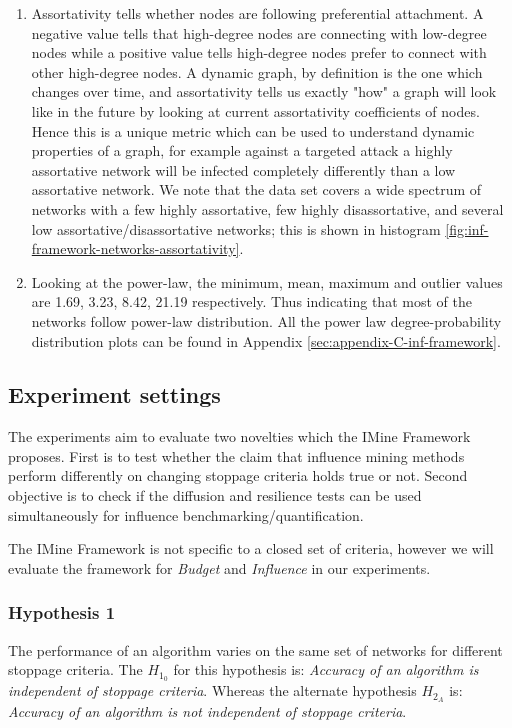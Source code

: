 \begin{enumerate}
			\item Assortativity tells whether nodes are following preferential attachment. A negative value tells that high-degree nodes are connecting with low-degree nodes while a positive value tells high-degree nodes prefer to connect with other high-degree nodes. A dynamic graph, by definition is the one which changes over time, and assortativity tells us exactly "how" a graph will look like in the future by looking at current assortativity coefficients of nodes. Hence this is a unique metric which can be used to understand dynamic properties of a graph, for example against a targeted attack a highly assortative network will be infected completely differently than a low assortative network. We note that the data set covers a wide spectrum of networks with a few highly assortative, few highly disassortative, and several low assortative/disassortative networks; this is shown in histogram \ref{fig:inf-framework-networks-assortativity}.
			
			\item Looking at the power-law, the minimum, mean, maximum and outlier values are 1.69, 3.23, 8.42, 21.19 respectively. Thus indicating that most of the networks follow power-law distribution. All the power law degree-probability distribution plots can be found in Appendix \ref{sec:appendix-C-inf-framework}.
		\end{enumerate}
		
		\subsection{Experiment settings}
		The experiments aim to evaluate two novelties which the IMine Framework proposes. First is to test whether the claim that influence mining methods perform differently on changing stoppage criteria holds true or not. Second objective is to check if the diffusion and resilience tests can be used simultaneously for influence benchmarking/quantification.
		
		The IMine Framework is not specific to a closed set of criteria, however we will evaluate the framework for \textit{Budget} and \textit{Influence} in our experiments.
		
			\subsubsection{Hypothesis 1}
			The performance of an algorithm varies on the same set of networks for different stoppage criteria. The $H_{1_0}$ for this hypothesis is: \textit{Accuracy of an algorithm is independent of stoppage criteria}. Whereas the alternate hypothesis $H_{2_A}$ is: \textit{Accuracy of an algorithm is not independent of stoppage criteria}.


